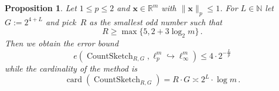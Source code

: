 \documentclass[12pt]{article}
\theoremstyle{plain}
\newtheorem{proposition}[theorem]{Proposition}
\theoremstyle{definition}
\DeclareMathOperator{\card}{card}
\newcommand{\embed}{\hookrightarrow}
\renewcommand{\vec}{\boldsymbol}
\newcommand{\R}{{\mathbb R}}
\newcommand{\N}{{\mathbb N}}
\DeclareMathOperator{\countsketch}{CountSketch}
\begin{document}
\begin{proposition}
    Let $1 \leq p \leq 2$ and $\vec{x} \in \R^m$ with $\|\vec{x}\|_p \leq 1$.
    For $L \in \N$ let $G := 2^{4+L}$ and pick~$R$ as the smallest odd number such that
    \begin{equation*}
        R \geq \max\{5, 2+ 3\log_2 m\} \,.
    \end{equation*}
    Then we obtain the error bound
    \begin{equation*}
        e(\countsketch_{R,G}, \ell_p^m \embed \ell_\infty^m)
            \leq 4 \cdot 2^{-\frac{L}{p}}
    \end{equation*}
    while the cardinality of the method is
    \begin{equation*}
        \card(\countsketch_{R,G}) = R \cdot G \asymp 2^{L} \cdot \log m \,.
    \end{equation*}
\end{proposition}
\end{document}
